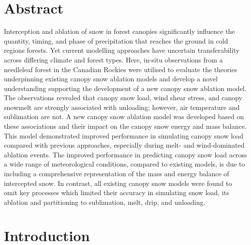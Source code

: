 \documentclass[
  letterpaper,
]{tex/uofsthesis-cs}
\begin{document}
\section{Abstract}\label{abstract-2}

Interception and ablation of snow in forest canopies significantly
influence the quantity, timing, and phase of precipitation that reaches
the ground in cold regions forests. Yet current modelling approaches
have uncertain transferability across differing climate and forest
types. Here, in-situ observations from a needleleaf forest in the
Canadian Rockies were utilised to evaluate the theories underpinning
existing canopy snow ablation models and develop a novel understanding
supporting the development of a new canopy snow ablation model. The
observations revealed that canopy snow load, wind shear stress, and
canopy snowmelt are strongly associated with unloading; however, air
temperature and sublimation are not. A new canopy snow ablation model
was developed based on these associations and their impact on the canopy
snow energy and mass balance. This model demonstrated improved
performance in simulating canopy snow load compared with previous
approaches, especially during melt- and wind-dominated ablation events.
The improved performance in predicting canopy snow load across a wide
range of meteorological conditions, compared to existing models, is due
to including a comprehensive representation of the mass and energy
balance of intercepted snow. In contrast, all existing canopy snow
models were found to omit key processes which limited their accuracy in
simulating snow load, its ablation and partitioning to sublimation,
melt, drip, and unloading.

\section{Introduction}\label{introduction-3}
\end{document}
